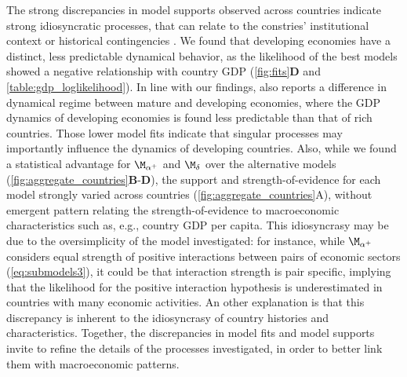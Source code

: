 The strong discrepancies in model supports observed across countries indicate strong idiosyncratic processes, that can relate to the constries' institutional context \citep{Acemoglu2005} or historical contingencies \citep{Silverberg2005a}. 
% 
We found that developing economies have a distinct, less predictable dynamical behavior, as the likelihood of the best models showed a negative relationship with country GDP (\cref{fig:fits}\textbf{D} and \cref{table:gdp_loglikelihood}). In line with our findings, \citep{Cristelli2015} also reports a difference in dynamical regime between mature and developing economies, where the GDP dynamics of developing economies is found less predictable than that of rich countries. Those lower model fits indicate that singular processes may importantly influence the dynamics of developing countries.
% 
% 
% 
% 
Also, while we found a statistical advantage for $\modalphap$ and $\moddelta$ over the alternative models (\cref{fig:aggregate_countries}\textbf{B}-\textbf{D}), the support and strength-of-evidence for each model strongly varied across countries (\cref{fig:aggregate_countries}A), without emergent pattern relating the strength-of-evidence to macroeconomic characteristics such as, e.g., country GDP per capita. This idiosyncrasy may be due to the oversimplicity of the model investigated: for instance, while $\modalphap$ considers equal strength of positive interactions between pairs of economic sectors (\cref{eq:submodels3}), it could be that interaction strength is pair specific, implying that the likelihood for the positive interaction hypothesis is underestimated in countries with many economic activities. An other explanation is that this discrepancy is inherent to the idiosyncrasy of country histories and characteristics.
% 
Together, the discrepancies in model fits and model supports invite to refine the details of the processes investigated, in order to better link them with macroeconomic patterns.

